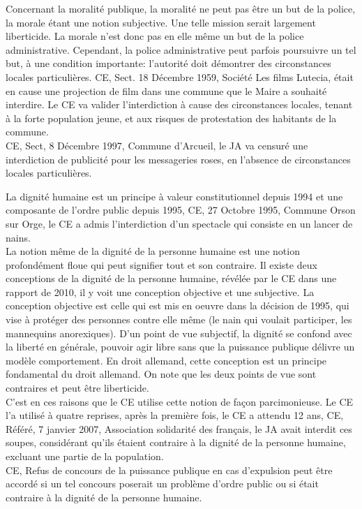 \documentclass[10pt, a4paper, openany]{book}
\begin{document}
Concernant la moralité publique, la moralité ne peut pas être un but de la police, la morale étant une notion subjective. Une telle mission serait largement liberticide. La morale n'est donc pas en elle même un but de la police administrative. Cependant, la police administrative peut parfois poursuivre un tel but, à une condition importante: l'autorité doit démontrer des circonstances locales particulières. CE, Sect. 18 Décembre 1959, Société Les films Lutecia, était en cause une projection de film dans une commune que le Maire a souhaité interdire. Le CE va valider l'interdiction à cause des circonstances locales, tenant à la forte population jeune, et aux risques de protestation des habitants de la commune. \\
CE, Sect, 8 Décembre 1997, Commune d'Arcueil, le JA va censuré une interdiction de publicité pour les messageries roses, en l'absence de circonstances locales particulières. 


La dignité humaine est un principe à valeur constitutionnel depuis 1994 et une composante de l'ordre public depuis 1995, CE, 27 Octobre 1995, Commune Orson sur Orge, le CE a admis l'interdiction d'un spectacle qui consiste en un lancer de nains. \\
La notion même de la dignité de la personne humaine est une notion profondément floue qui peut signifier tout et son contraire. Il existe deux conceptions de la dignité de la personne humaine, révélée par le CE dans une rapport de 2010, il y voit une conception objective et une subjective. La conception objective est celle qui est mis en oeuvre dans la décision de 1995, qui vise à protéger des personnes contre elle même (le nain qui voulait participer, les mannequins anorexiques). D'un point de vue subjectif, la dignité se confond avec la liberté en générale, pouvoir agir libre sans que la puissance publique délivre un modèle comportement. En droit allemand, cette conception est un principe fondamental du droit allemand. On note que les deux points de vue sont contraires et peut être liberticide. \\
C'est en ces raisons que le CE utilise cette notion de façon parcimonieuse. Le CE l'a utilisé à quatre reprises, après la première fois, le CE a attendu 12 ans, CE, Référé, 7 janvier 2007, Association solidarité des français, le JA avait interdit ces soupes, considérant qu'ils étaient contraire à la dignité de la personne humaine, excluant une partie de la population. \\
CE, Refus de concours de la puissance publique en cas d'expulsion peut être accordé si un tel concours poserait un problème d'ordre public ou si était contraire à la dignité de la personne humaine.
\end{document}
